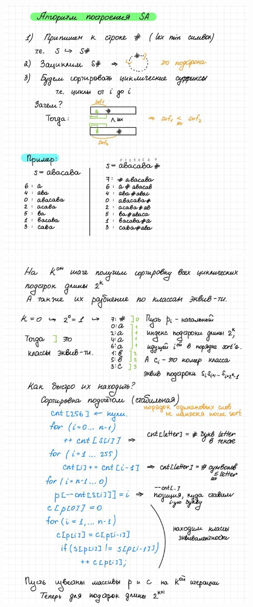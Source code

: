 \includegraphics[width=1\linewidth]{images/Build_SA1.jpg} \newpage
\includegraphics[width=1\linewidth]{images/Build_SA2.jpg} \newpage
